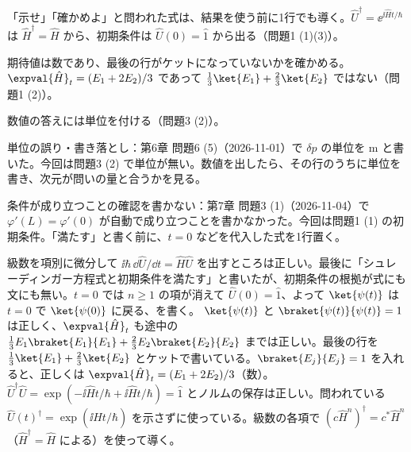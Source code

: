 \begin{daiji}
  \item 「示せ」「確かめよ」と問われた式は、結果を使う前に1行でも導く。$\hat{U}^{\dagger}=\ee^{\ii\hat{H}t/\hbar}$ は $\hat{H}^{\dagger}=\hat{H}$ から、初期条件は $\hat{U}(0)=\hat{1}$ から出る（問題1 (1)(3)）。
  \item 期待値は数であり、最後の行がケットになっていないかを確かめる。$\expval{\hat{H}}_{t}=(E_{1}+2E_{2})/3$ であって $\frac{1}{3}\ket{E_{1}}+\frac{2}{3}\ket{E_{2}}$ ではない（問題1 (2)）。
  \item 数値の答えには単位を付ける（問題3 (2)）。
\end{daiji}
\begin{maemo}
  \item 単位の誤り・書き落とし：第6章 問題6 (5)（2026-11-01）で $\delta p$ の単位を $\unit{\metre}$ と書いた。今回は問題3 (2) で単位が無い。数値を出したら、その行のうちに単位を書き、次元が問いの量と合うかを見る。
  \item 条件が成り立つことの確認を書かない：第7章 問題3 (1)（2026-11-04）で $\varphi'(L)=\varphi'(0)$ が自動で成り立つことを書かなかった。今回は問題1 (1) の初期条件。「満たす」と書く前に、$t=0$ などを代入した式を1行置く。
\end{maemo}
\begin{kotaeran}
   級数を項別に微分して $\ii\hbar\,\dd\hat{U}/\dd t=\hat{H}\hat{U}$ を出すところは正しい。最後に「シュレーディンガー方程式と初期条件を満たす」と書いたが、初期条件の根拠が式にも文にも無い。$t=0$ では $n\ge1$ の項が消えて $\hat{U}(0)=\hat{1}$、よって $\ket{\psi(t)}$ は $t=0$ で $\ket{\psi(0)}$ に戻る、を書く。
   $\ket{\psi(t)}$ と $\braket{\psi(t)}{\psi(t)}=1$ は正しく、$\expval{\hat{H}}_{t}$ も途中の $\frac{1}{3}E_{1}\braket{E_{1}}{E_{1}}+\frac{2}{3}E_{2}\braket{E_{2}}{E_{2}}$ までは正しい。最後の行を $\frac{1}{3}\ket{E_{1}}+\frac{2}{3}\ket{E_{2}}$ とケットで書いている。$\braket{E_{j}}{E_{j}}=1$ を入れると、正しくは $\expval{\hat{H}}_{t}=(E_{1}+2E_{2})/3$（数）。
   $\hat{U}^{\dagger}\hat{U}=\exp(-\ii\hat{H}t/\hbar+\ii\hat{H}t/\hbar)=\hat{1}$ とノルムの保存は正しい。問われている $\hat{U}(t)^{\dagger}=\exp(\ii\hat{H}t/\hbar)$ を示さずに使っている。級数の各項で $(c\hat{H}^{n})^{\dagger}=c^{*}\hat{H}^{n}$（$\hat{H}^{\dagger}=\hat{H}$ による）を使って導く。
\end{kotaeran}
